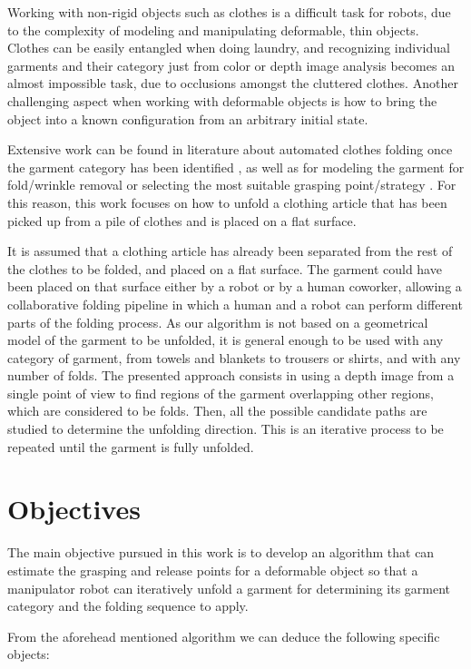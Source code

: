 Working with non-rigid objects such as clothes is a difficult task for robots, due to the complexity of modeling and manipulating deformable, thin objects. Clothes can be easily entangled when doing laundry, and recognizing individual garments and their category just from color or depth image analysis becomes an almost impossible task, due to occlusions amongst the cluttered clothes. Another challenging aspect when working with deformable objects is how to bring the object into a known configuration from an arbitrary initial state.

Extensive work can be found in literature about automated clothes folding once the garment category has been identified  , as well as for modeling the garment for fold/wrinkle removal or selecting the most suitable grasping point/strategy . For this reason, this work focuses on how to unfold a clothing article that has been picked up from a pile of clothes and is placed on a flat surface.

It is assumed that a clothing article has already been separated from the rest of the clothes to be folded, and placed on a flat surface. The garment could have been placed on that surface either by a robot or by a human coworker, allowing a collaborative folding pipeline in which a human and a robot can perform different parts of the folding process.
As our algorithm is not based on a geometrical model of the garment to be unfolded, it is general enough to be used with any category of garment, from towels and blankets to trousers or shirts, and with any number of folds. 
%
The presented approach consists in using a depth image from a single point of view to find regions of the garment overlapping other regions, which are considered to be folds. Then, all the possible candidate paths are studied to determine the unfolding direction. This is an iterative process to be repeated until the garment is fully unfolded.

\section{Objectives}
\label{intro_objectives}
The main objective pursued in this work is to develop an algorithm that can estimate the grasping and release points for a deformable object so that a manipulator robot can iteratively unfold a garment for determining its garment category and the folding sequence to apply.

From the aforehead mentioned algorithm we can deduce the following specific objects:

